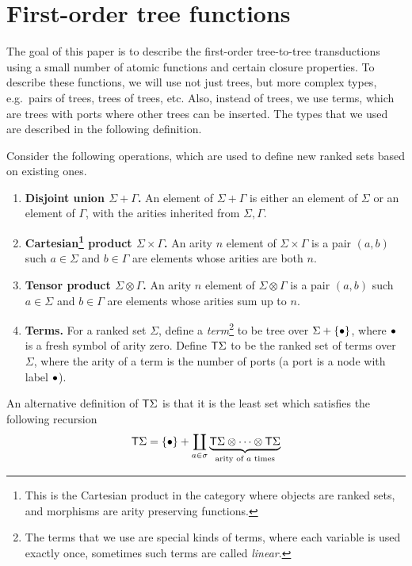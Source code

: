 
\section{First-order tree functions}
The goal of this paper is to describe the first-order tree-to-tree transductions using a small number of atomic functions and certain closure properties. To describe these functions, we will use not just trees, but more complex types, e.g.~pairs of trees, trees of trees, etc. Also, instead of trees, we use terms, which are trees with ports where other trees can be inserted. 
The types that we used are described in the following definition. 


\begin{definition}\label{def:type-constructors}
    Consider the following operations, which are used to define new ranked sets based on existing ones.
\begin{enumerate}
    \item {\bf Disjoint union $\Sigma+\Gamma$.} An element of $\Sigma+\Gamma$ is either an element of $\Sigma$ or an element of $\Gamma$, with the arities inherited from $\Sigma,\Gamma$. 
    \item {\bf Cartesian\footnote{This is the Cartesian product in the category where objects are ranked sets, and morphisms are arity preserving functions.}  product $\Sigma \times \Gamma$.} An arity $n$ element of $\Sigma \times \Gamma$ is a pair $(a,b)$ such $a \in \Sigma$ and $b \in \Gamma$ are elements whose arities are both $n$.
    \item {\bf Tensor product $\Sigma \otimes \Gamma$.} An arity $n$ element of $\Sigma \otimes \Gamma$ is a pair $(a,b)$ such $a \in \Sigma$ and $b \in \Gamma$ are elements whose arities sum up to $n$.
    \item {\bf Terms.} For a ranked set  $\Sigma$, define a \emph{term}\footnote{The terms that we use are special kinds of terms, where each variable is used exactly once, sometimes such terms are called \emph{linear}.} to be tree over $\Sigma + \{\bullet\}$, where $\bullet$ is a fresh symbol of arity zero. Define $\mathsf T \Sigma$ to be the ranked set of terms over $\Sigma$, where the arity of a term is the number of ports (a port is a node with label $\bullet$).
\end{enumerate}    
\end{definition}


An alternative definition of $\mathsf T \Sigma$ is that it is the least set which satisfies the following recursion
\begin{align*}
    \mathsf T \Sigma = \{\bullet\} + \coprod_{a \in \sigma} \underbrace{\mathsf T \Sigma \otimes \cdots \otimes \mathsf T \Sigma}_{\text{arity of $a$ times}}
\end{align*}

